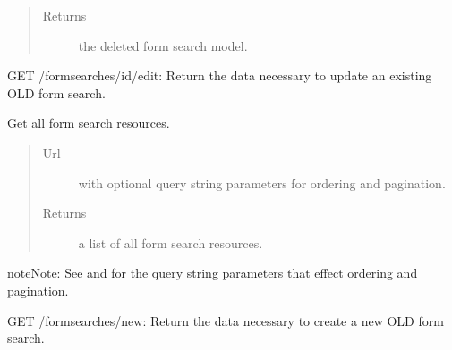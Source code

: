 \documentclass[letterpaper,10pt,english]{sphinxmanual}
\begin{document}
\begin{fulllineitems}
\begin{fulllineitems}
\begin{quote}
\begin{description}
\item[{Returns}] \leavevmode
the deleted form search model.

\end{description}\end{quote}

\end{fulllineitems}


\begin{fulllineitems}
\label{api:onlinelinguisticdatabase.controllers.formsearches.FormsearchesController.edit}
GET /formsearches/id/edit: Return the data necessary to update an existing
OLD form search.

\end{fulllineitems}


\begin{fulllineitems}
\label{api:onlinelinguisticdatabase.controllers.formsearches.FormsearchesController.index}
Get all form search resources.
\begin{quote}\begin{description}
\item[{Url }] \leavevmode
{} with optional query string parameters for
ordering and pagination.

\item[{Returns}] \leavevmode
a list of all form search resources.

\end{description}\end{quote}

\begin{notice}{note}{Note:}
See  and  for the
query string parameters that effect ordering and pagination.
\end{notice}

\end{fulllineitems}


\begin{fulllineitems}
\label{api:onlinelinguisticdatabase.controllers.formsearches.FormsearchesController.new}
GET /formsearches/new: Return the data necessary to create a new OLD
form search.


\end{fulllineitems}
\end{fulllineitems}
\end{document}
